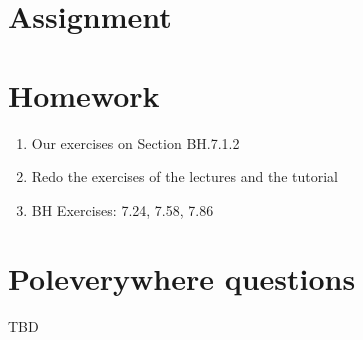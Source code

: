 \documentclass[a4paper,12pt]{book}
\begin{document}
\section{Assignment}
\label{sec:assignment}






\section{Homework}
\label{sec:homework}

\begin{enumerate}
\item Our exercises on Section BH.7.1.2
\item Redo the exercises of the lectures and the tutorial
\item BH Exercises: 7.24, 7.58, 7.86
\end{enumerate}



\section{Poleverywhere questions}
\label{sec:polev-quest}


TBD


\end{document}

